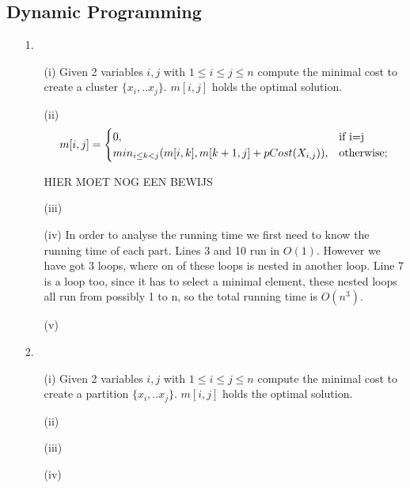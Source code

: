 \documentclass{article}
\begin{document}
\subsection*{Dynamic Programming}
\begin{itemize}
\item[1.]
\begin{itemize}

\item[(i)] Given 2 variables $i,j$ with $1\le i \le j \le n$ compute the minimal cost to create a cluster $\{x_i,..x_j\}$. $m[i,j]$ holds the optimal solution.

\item[(ii)] 
\[
m[i,j]=
\begin{cases}
0, & \text{if i=j}\\
min_{i \le k < j}(m[i,k],m[k+1,j] + pCost(X_{i,j})), & $\text{otherwise;}$
\end{cases}
\]

HIER MOET NOG EEN BEWIJS
\item[(iii)]
\begin{algorithmic}[1]
\ENDFOR
{}
	\ENDFOR
\ENDFOR
{}
\end{algorithmic}

\item[(iv)] In order to analyse the running time we first need to know the running time of each part. Lines 3 and 10 run in $O(1)$. However we have got 3 loops, where on of these loops is nested in another loop. Line 7 is a loop too, since it has to select a minimal element, these nested loops all run from possibly 1 to n, so the total running time is $O(n^3)$.

\item[(v)]
\begin{algorithmic}[1]
\ENDFOR
{}
\ENDIF
\ENDFOR
\ENDFOR
\ENDFOR
{}
\end{algorithmic}
\end{itemize}


\item[2.]
\begin{itemize}

\item[(i)] Given 2 variables $i,j$ with $1\le i \le j \le n$ compute the minimal cost to create a partition $\{x_i,..x_j\}$. $m[i,j]$ holds the optimal solution.

\item[(ii)] 

\item[(iii)]

\item[(iv)]

\end{itemize}
\end{itemize}
\end{document}
